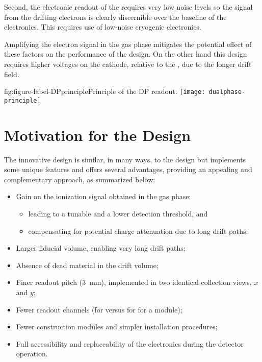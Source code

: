 Second, the electronic readout of the  requires very low noise levels so the signal from the drifting electrons is clearly discernible over the baseline of the electronics.  This requires use of low-noise cryogenic electronics. 

Amplifying the electron signal in the gas phase mitigates the potential effect of these factors on the performance of the  design.  On the other hand this design requires  higher voltages on the cathode, relative to the , due to the longer drift field. 

\begin{dunefigure}{fig:figure-label-DPprinciple}{Principle of the DP readout.}
\texttt{[image: dualphase-principle]}
\end{dunefigure}

\section{Motivation for the \dual Design} 
\label{sec:dp-execsum-design-motivation}

The innovative  design is similar, in many ways, to the  design but implements some unique features and offers several advantages, providing an appealing and complementary approach, as summarized below:

\begin{itemize}
\item Gain on the ionization signal obtained in the gas phase:
\begin{itemize}
\item  leading to a tunable  and a lower detection threshold, and
\item  compensating for potential charge attenuation due to long drift paths; 
\end{itemize}
\item  Larger fiducial volume, enabling very long drift paths;
\item  Absence of dead material in the  drift volume;
\item  Finer readout pitch (\SI{3}{mm}), implemented in two identical collection views, $x$ and $y$;
\item  Fewer readout channels (\dpnumcrpch for  versus \spnumch for  for a  \nominalmodsize module); 
\item  Fewer construction modules and simpler installation procedures;
\item  Full accessibility and replaceability of the  electronics during the detector operation.
\end{itemize}

